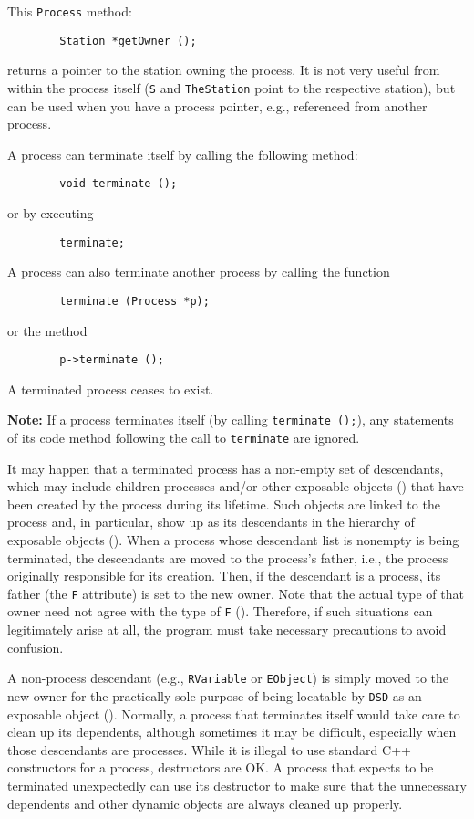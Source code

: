 \medskip

This {\tt Process} method:
\begin{verbatim}
        Station *getOwner ();
\end{verbatim}
returns a pointer to the station owning the process. 
It is not very useful from within the process itself ({\tt S} and
{\tt TheStation} point to the respective station), but can be used when you
have a process pointer, e.g., referenced from another process.

A process can terminate itself by calling the following method:
\begin{verbatim}
        void terminate ();
\end{verbatim}
or by executing
\begin{verbatim}
        terminate;
\end{verbatim}
A process can also terminate another process by calling the function
\begin{verbatim}
        terminate (Process *p);
\end{verbatim}
or the method
\begin{verbatim}
        p->terminate ();
\end{verbatim}

\noindent
A terminated process ceases to exist.

\medskip

\noindent
{\bf Note:} If a process terminates itself (by calling {\tt terminate~();}),
any statements of its code method
following the call to {\tt terminate} are ignored.

\medskip

It may happen that a terminated process has a non-empty set of descendants,
which may include children processes and/or other exposable objects
() that
have been created by the process during its lifetime.
Such objects are linked to the process and, in particular, show up as its
descendants in the hierarchy of exposable objects ().
When a process whose descendant list is nonempty is being terminated,
the descendants are moved to the process's father, i.e., the process
originally responsible for its creation.
Then, if the descendant is a process, its father (the {\tt F} attribute)
is set to the new owner.
Note that the actual type of that owner need not agree with the type of
{\tt F} ().
Therefore, if such situations can legitimately arise at all, the program must
take necessary precautions to avoid confusion.

A non-process descendant (e.g., {\tt RVariable} or {\tt EObject}) is simply
moved to the new owner for the practically sole purpose of being locatable
by {\tt DSD} as an exposable object ().
Normally, a process that terminates itself would take care to clean up its
dependents, although sometimes it may be difficult, especially when those
descendants are processes.
While it is illegal to use standard C++ constructors for a process, destructors
are OK.
A process that expects to be terminated unexpectedly
can use its destructor to make sure that the unnecessary dependents and other
dynamic objects are always cleaned up properly.

